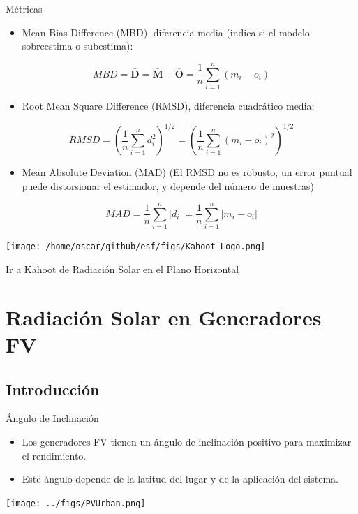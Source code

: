 \documentclass[xcolor={usenames,svgnames,dvipsnames}]{beamer}
\begin{document}
\begin{frame}[label={sec:org2b0e5fb}]{Métricas}
\begin{itemize}
\item \alert{Mean Bias Difference (MBD)}, diferencia media (indica si el modelo sobreestima o subestima):
\end{itemize}
\[
MBD = \overline{\mathbf{D}} = \overline{\mathbf{M}} - \overline{\mathbf{O}} = \frac{1}{n} \sum_{i=1}^n (m_i - o_i)
\]

\begin{itemize}
\item \alert{Root Mean Square Difference (RMSD)}, diferencia cuadrático media:
\end{itemize}
\[
RMSD = \left(\frac{1}{n} \sum_{i=1}^n d_i^2 \right)^{1/2} =  \left( \frac{1}{n} \sum_{i=1}^n (m_i - o_i)^2  \right)^{1/2}
\]

\begin{itemize}
\item \alert{Mean Absolute Deviation (MAD)} (El RMSD no es robusto, un error puntual puede distorsionar el estimador, y depende del número de muestras)
\end{itemize}

\[
MAD = \frac{1}{n} \sum_{i=1}^n \left|d_i\right| =  \frac{1}{n} \sum_{i=1}^n \left|m_i - o_i\right|
\]
\end{frame}
\begin{frame}[label={sec:org6f5071c}]{}
\begin{center}
\texttt{[image: /home/oscar/github/esf/figs/Kahoot\_Logo.png]}
\end{center}

\href{https://play.kahoot.it/v2/?quizId=62ee25e6-4056-4321-b95c-7af71b3fb069}{Ir a Kahoot de Radiación Solar en el Plano Horizontal}
\end{frame}

\section{Radiación Solar en Generadores FV}
\label{sec:org6f3c2bf}

\subsection{Introducción}
\label{sec:orgc4aa564}

\begin{frame}[label={sec:org96adfb2}]{Ángulo de Inclinación}
\begin{itemize}
\item Los generadores FV tienen un ángulo de inclinación positivo para maximizar el rendimiento.
\item Este ángulo depende de la latitud del lugar y de la aplicación del sistema.
\end{itemize}

\begin{center}
\texttt{[image: ../figs/PVUrban.png]}
\end{center}
\end{frame}
\end{document}
